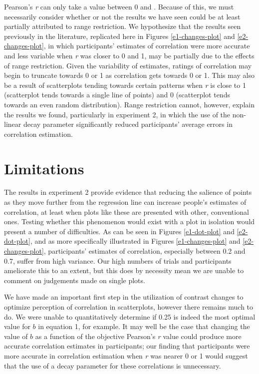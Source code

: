 \documentclass[preprint, 3p,
authoryear]{elsarticle} %
\begin{document}
Pearson's \emph{r} can only take a value between 0 and
\textbar. Because of this, we must necessarily consider whether
or not the results we have seen could be at least partially attributed
to range restriction. We hypothesize that the results seen previously in
the literature, replicated here in Figures \ref{e1-changes-plot} and
\ref{e2-changes-plot}, in which participants' estimates of correlation
were more accurate and less variable when \emph{r} was closer to 0 and
1, may be partially due to the effects of range restriction. Given the
variability of estimates, ratings of correlation may begin to truncate
towards 0 or 1 as correlation gets towards 0 or 1. This may also be a
result of scatterplots tending towards certain patterns when \emph{r} is
close to 1 (scatterplot tends towards a single line of points) and 0
(scatterplot tends towards an even random distribution). Range
restriction cannot, however, explain the results we found, particularly
in experiment 2, in which the use of the non-linear decay parameter
significantly reduced participants' average errors in correlation
estimation.

\hypertarget{limitations}{%
\section{Limitations}\label{limitations}}

The results in experiment 2 provide evidence that reducing the salience
of points as they move further from the regression line can increase
people's estimates of correlation, at least when plots like these are
presented with other, conventional ones. Testing whether this phenomenon
would exist with a plot in isolation would present a number of
difficulties. As can be seen in Figures \ref{e1-dot-plot} and
\ref{e2-dot-plot}, and as more specifically illustrated in Figures
\ref{e1-changes-plot} and \ref{e2-changes-plot}, participants' estimates
of correlation, especially between 0.2 and 0.7, suffer from high
variance. Our high numbers of trials and participants ameliorate this to
an extent, but this does by necessity mean we are unable to comment on
judgements made on single plots.

We have made an important first step in the utilization of contrast
changes to optimize perception of correlation in scatterplots, however
there remains much to do. We were unable to quantitatively determine if
0.25 is indeed the most optimal value for \(b\) in equation 1, for
example. It may well be the case that changing the value of \(b\) as a
function of the objective Pearson's \emph{r} value could produce more
accurate correlation estimates in participants; our finding that
participants were more accurate in correlation estimation when \emph{r}
was nearer 0 or 1 would suggest that the use of a decay parameter for
these correlations is unnecessary.
\end{document}
